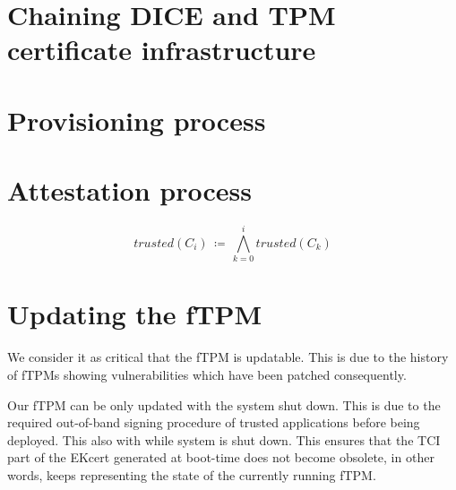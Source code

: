 
\section{Chaining DICE and TPM certificate infrastructure}

\section{Provisioning process}


\section{Attestation process}


\begin{equation}
trusted(C_{i}) \, \coloneqq \, \bigwedge_{k=0}^{i} trusted(C_{k})
\end{equation}

\section{Updating the fTPM}

We consider it as critical that the \ac{fTPM} is updatable. This is due to the history of \acp{fTPM} showing vulnerabilities which have been patched consequently. %

Our \ac{fTPM} can be only updated with the system shut down. This is due to the required out-of-band signing procedure of trusted applications before being deployed. This also  with while system is shut down. This ensures that the TCI part of the EKcert generated at boot-time does not become obsolete, in other words, keeps representing the state of the currently running fTPM.



